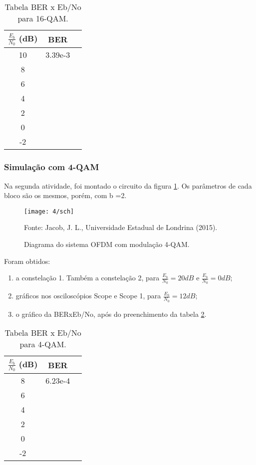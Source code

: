\begin{table}[H]
  \begin{center}
    \caption{Tabela BER x Eb/No para 16-QAM.}
    \begin{tabular}{ccc}
      \toprule
      $\frac{E_b}{N_0}$ (dB) & BER \\
      \midrule
      10 & 3.39e-3 \\
      8 &  \\
      6 & \\
      4 & \\
      2 & \\
      0 & \\
      -2 & \\
      \bottomrule
    \end{tabular}
    \label{tab:ber16}
  \end{center}
\end{table}

\subsubsection{Simulação com 4-QAM}

Na segunda atividade, foi montado o circuito da figura \ref{fig:4sch}. Os parâmetros de cada bloco são os mesmos, porém, com b =2.

\begin{figure}[H]
  \centering
  \caption{Diagrama do sistema OFDM com modulação 4-QAM.}
  \texttt{[image: 4/sch]}
  \label{fig:4sch}
  
  \small Fonte: Jacob, J. L., Universidade Estadual de Londrina (2015).
\end{figure}

Foram obtidos:

\begin{enumerate}
  \item a constelação 1. Também a constelação 2, para $\frac{E_b}{N_0} = 20 dB$ e $\frac{E_b}{N_0} = 0 dB$;
  
  \item gráficos nos osciloscópios Scope e Scope 1, para $\frac{E_b}{N_0} = 12 dB$;
  
  \item o gráfico da BERxEb/No, após do preenchimento da tabela \ref{tab:ber4}.
\end{enumerate}

\begin{table}[H]
  \begin{center}
    \caption{Tabela BER x Eb/No para 4-QAM.}
    \begin{tabular}{ccc}
      \toprule
      $\frac{E_b}{N_0}$ (dB) & BER \\
      \midrule
      8 & 6.23e-4 \\
      6 & \\
      4 & \\
      2 & \\
      0 & \\
      -2 & \\
      \bottomrule
    \end{tabular}
    \label{tab:ber4}
  \end{center}
\end{table}

